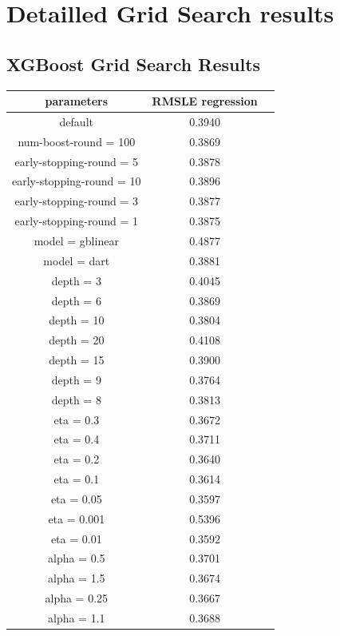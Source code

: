 \documentclass[a4paper]{article}
\begin{document}
\section{Detailled Grid Search results}
\label{results_appendix}

\subsection{XGBoost Grid Search Results}
\begin{table}[H]
    \centering
    \begin{tabular}{ccc}
        parameters & RMSLE regression\\
        \hline
        default & 0.3940 \\
        num-boost-round = 100 & 0.3869 \\
        early-stopping-round = 5 & 0.3878 \\
        early-stopping-round = 10 & 0.3896 \\
        early-stopping-round = 3 & 0.3877 \\
        early-stopping-round = 1 & 0.3875 \\
        model = gblinear & 0.4877 \\
        model = dart & 0.3881 \\
        depth = 3 & 0.4045 \\
        depth = 6 & 0.3869 \\
        depth = 10 & 0.3804 \\
        depth = 20 & 0.4108 \\
        depth = 15 & 0.3900 \\
        depth = 9 & 0.3764 \\
        depth = 8 & 0.3813 \\
        eta = 0.3 & 0.3672 \\
        eta = 0.4 & 0.3711 \\
        eta = 0.2 & 0.3640 \\
        eta = 0.1 & 0.3614 \\
        eta = 0.05 & 0.3597 \\
        eta = 0.001 & 0.5396 \\
        eta = 0.01 & 0.3592 \\
        alpha = 0.5 & 0.3701 \\
        alpha = 1.5 & 0.3674 \\
        alpha = 0.25 & 0.3667 \\
        alpha = 1.1 & 0.3688 \\

\end{tabular}
\end{table}
\end{document}
